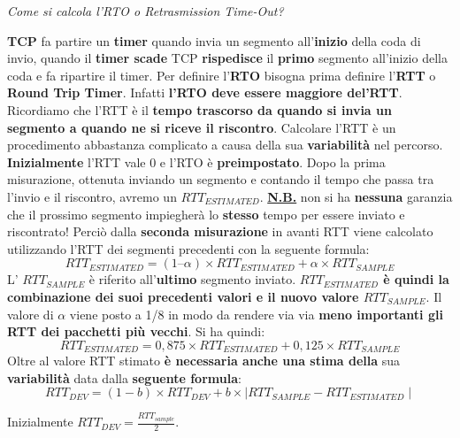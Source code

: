\documentclass[11pt,a4paper]{article}
\theoremstyle{definition}
\begin{document}
\newpage
\begin{flushleft}
	\textit{Come si calcola l'RTO o Retrasmission Time-Out?}
\end{flushleft}
\textbf{TCP} fa partire un \textbf{timer} quando invia un segmento all'\textbf{inizio} della coda di invio, quando il \textbf{timer scade} TCP \textbf{rispedisce} il \textbf{primo} segmento all'inizio della coda e fa ripartire il timer. Per definire l'\textbf{RTO} bisogna prima definire l'\textbf{RTT} o \textbf{Round Trip Timer}. Infatti \textbf{l'RTO deve essere maggiore del'RTT}. Ricordiamo che l'RTT è il \textbf{tempo trascorso da quando si invia un segmento a quando ne si riceve il riscontro}. Calcolare l'RTT è un procedimento abbastanza complicato a causa della sua \textbf{variabilità} nel percorso.\newline
\textbf{Inizialmente} l'RTT vale 0 e l'RTO è \textbf{preimpostato}. Dopo la prima misurazione, ottenuta inviando un segmento e contando il tempo che passa tra l'invio e il riscontro, avremo un $RTT_{ESTIMATED}$. \newline\newline
\textbf{\underline{N.B.}} non si ha \textbf{nessuna} garanzia che il prossimo segmento impiegherà lo \textbf{stesso} tempo per essere inviato e riscontrato!\newline\newline
Perciò dalla \textbf{seconda misurazione} in avanti RTT viene calcolato utilizzando l'RTT dei segmenti precedenti con la seguente formula:
\begin{equation}
	RTT_{ESTIMATED} = (1 – \alpha) \times RTT_{ESTIMATED} + \alpha \times RTT_{SAMPLE}
\end{equation}
L' $RTT_{SAMPLE}$ è riferito all'\textbf{ultimo} segmento inviato.\textbf{ $RTT_{ESTIMATED}$ è quindi la combinazione dei suoi precedenti valori e il nuovo valore $RTT_{SAMPLE}$}. Il valore di $\alpha$ viene posto a 1/8 in modo da rendere via via \textbf{meno importanti gli RTT dei pacchetti più vecchi}. Si ha quindi:
\begin{equation}
	RTT_{ESTIMATED} = 0,875 \times RTT_{ESTIMATED} + 0,125 \times RTT_{SAMPLE}
\end{equation}
Oltre al valore RTT stimato \textbf{è necessaria anche una stima della} sua \textbf{variabilità} data dalla \textbf{seguente formula}:
\begin{equation}
	RTT_{DEV} = (1 - b) \times RTT_{DEV} + b \times \mid RTT_{SAMPLE} - RTT_{ESTIMATED} \mid
\end{equation}
\begin{flushleft}
	Inizialmente $RTT_{DEV} = \frac{RTT_{sample}}{2}$.
\end{flushleft}
\end{document}
